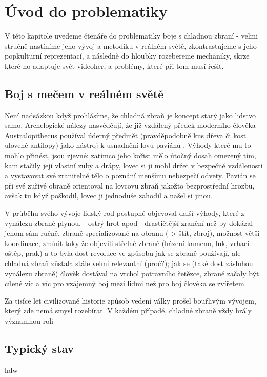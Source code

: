 \chapter{Úvod do problematiky}
V této kapitole uvedeme čtenáře do problematiky boje s chladnou zbraní - velmi stručně nastíníme jeho vývoj a metodiku v reálném světě, zkontrastujeme s jeho popkulturní reprezentací, a následně do hloubky rozebereme mechaniky, skrze které ho adaptuje svět videoher, a problémy, které při tom musí řešit.


\section{Boj s mečem v reálném světě}
Není nadsázkou když prohlásíme, že chladná zbraň je koncept starý jako lidstvo samo. Archelogické nálezy nasvědčují, že již vzdálený předek moderního člověka Australopithecus používal úderný předmět (pravděpodobně kus dřeva či kost ulovené antilopy) jako nástroj k usnadnění lovu paviánů \cite{AustralopithecusWeapon}. Výhody které mu to mohlo přinést, jsou zjevné: zatímco jeho kořist mělo útočný dosah omezený tím, kam stačily její vlastní zuby a drápy, lovec si ji mohl držet v bezpečné vzdálenosti a vystavovat své zranitelné tělo o poznání menšímu nebezpečí odvety. Pavián se při své zuřivé obraně orientoval na lovcovu zbraň jakožto bezprostřední hrozbu, avšak tu když poškodil, lovec ji jednoduše zahodil a našel si jinou.  

V průběhu svého vývoje lidský rod postupně objevoval další výhody, které z vynálezu zbraně plynou. - ostrý hrot apod - drastičtější zranění než by dokázal jenom sám ručně, zbraně specializované na obranu (-> štít, zbroj), možnost větší koordinace, zmínit taky že objevili střelné zbraně (házení kamenu, luk, vrhací oštěp, prak) a to byla dost revoluce ve způsobu jak se zbraně používají, ale chladná zbraň zůstala stále velmi relevantní (proč?); jak se (také dost zásluhou vynálezu zbraně) člověk dostával na vrchol potravního řetězce, zbraně začaly být cílené víc a víc pro vzájemný boj mezi lidmi než pro boj člověka se zvířetem

Za tisíce let civilizované historie způsob vedení války prošel bouřlivým vývojem, který zde nemá smysl rozebírat. V každém případě, chladné zbraně vždy hrály významnou roli 



\section{Typický stav}
hdw

